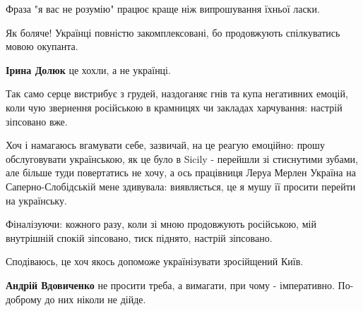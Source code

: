 \begin{itemize}
Фраза "я вас не розумію" працює краще ніж випрошування їхньої ласки.

 
Як боляче! Українці повністю закомплексовані, бо продовжують спілкуватись мовою окупанта.

\begin{itemize}
 
\textbf{Ірина Долюк} це хохли, а не українці.
\end{itemize}

 

Так само серце вистрибує з грудей, наздоганяє гнів та купа негативних емоцій,
коли чую звернення російською в крамницях чи закладах харчування: настрій
зіпсовано вже.

Хоч і намагаюсь вгамувати себе, зазвичай, на це реагую емоційно: прошу
обслуговувати українською, як це було в Sicily - перейшли зі стиснутими зубами,
але більше туди повертатись не хочу, а ось працівниця Леруа Мерлен Україна на
Саперно-Слобідській мене здивувала: виявляється, це я мушу її просити перейти
на українську.

Фіналізуючи: кожного разу, коли зі мною продовжують російською, мій внутрішній
спокій зіпсовано, тиск піднято, настрій зіпсовано.

Сподіваюсь, це хоч якось допоможе українізувати зросійщений Київ.

\begin{itemize}
 
\textbf{Андрій Вдовиченко} не просити треба, а вимагати, при чому - імперативно.
По-доброму до них ніколи не дійде.
\end{itemize}


\end{itemize}
